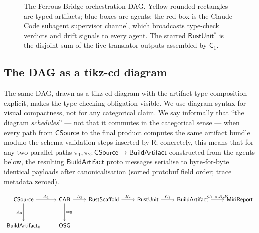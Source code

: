 \documentclass[12pt]{article}
\theoremstyle{definition}
\theoremstyle{remark}
\newcommand{\Agent}[1]{\ensuremath{\mathsf{#1}}}
\newcommand{\Artifact}[1]{\ensuremath{\mathsf{#1}}}
\newcommand{\CSrc}{\Artifact{CSource}}
\newcommand{\CAB}{\Artifact{CAB}}
\newcommand{\OSG}{\Artifact{OSG}}
\newcommand{\Scaff}{\Artifact{RustScaffold}}
\newcommand{\RUnit}{\Artifact{RustUnit}}
\newcommand{\BArt}{\Artifact{BuildArtifact}}
\newcommand{\MiriR}{\Artifact{MiriReport}}
\begin{document}
\begin{figure}[t]
\caption{The Ferrous Bridge orchestration DAG. Yellow rounded
rectangles are typed artifacts; blue boxes are agents; the red box is
the Claude Code subagent supervisor channel, which broadcasts type-check verdicts
and drift signals to every agent. The starred \RUnit\(^*\) is the
disjoint sum of the five translator outputs assembled by
\(\Agent{C}_1\).}
\label{fig:dag}
\end{figure}

\subsection{The DAG as a tikz-cd diagram}
\label{sec:tikz-cd}

The same DAG, drawn as a tikz-cd diagram with the artifact-type
composition explicit, makes the type-checking obligation visible. We
use diagram syntax for visual compactness, not for any categorical
claim. We say informally that ``the diagram \emph{schedules}'' --- not
that it commutes in the categorical sense --- when every path from
\CSrc{} to the final product computes the same artifact bundle modulo
the schema validation steps inserted by \(\Agent{R}\); concretely,
this means that for any two parallel paths \(\pi_1, \pi_2 : \CSrc{}
\to \BArt{}\) constructed from the agents below, the resulting \BArt{}
proto messages serialise to byte-for-byte identical payloads after
canonicalisation (sorted protobuf field order; trace metadata
zeroed).

\begin{equation*}
\begin{tikzcd}[column sep=8mm, row sep=10mm]
\CSrc \arrow[r, "A_1"] \arrow[d, swap, "A_3"]
  & \CAB \arrow[r, "A_2"] \arrow[d, "\text{osg}"]
  & \Scaff \arrow[r, "B_\ast"]
  & \RUnit \arrow[r, "C_1"]
  & \BArt \arrow[r, "{C_{2..5},K,F}"]
  & \MiriR \\
\BArt_0
  & \OSG
  & & & &
\end{tikzcd}
\end{equation*}
\end{document}

